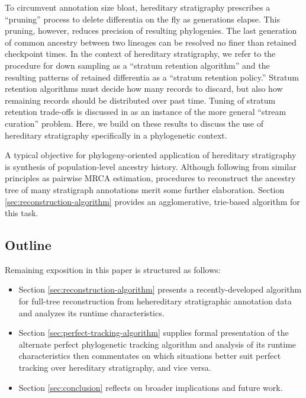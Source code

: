 To circumvent annotation size bloat, hereditary stratigraphy prescribes a ``pruning'' process to delete differentia on the fly as generations elapse.
This pruning, however, reduces precision of resulting phylogenies.
The last generation of common ancestry between two lineages can be resolved no finer than retained checkpoint times.
In the context of hereditary stratigraphy, we refer to the procedure for down sampling as a ``stratum retention algorithm'' and the resulting patterns of retained differentia as a ``stratum retention policy.''
Stratum retention algorithms must decide how many records to discard, but also how remaining records should be distributed over past time.
Tuning of stratum retention trade-offs is discussed in \citet{OTHERPREPRINT} as an instance of the more general ``stream curation'' problem. %
Here, we build on these results to discuss the use of hereditary stratigraphy specifically in a phylogenetic context.

A typical objective for phylogeny-oriented application of hereditary stratigraphy is synthesis of population-level ancestry history.
Although following from similar principles as pairwise MRCA estimation, procedures to reconstruct the ancestry tree of many stratigraph annotations merit some further elaboration.
Section \ref{sec:reconstruction-algorithm} provides an agglomerative, trie-based algorithm for this task.

\subsection{Outline}

Remaining exposition in this paper is structured as follows:
\begin{itemize}
\item Section \ref{sec:reconstruction-algorithm} presents a recently-developed algorithm for full-tree reconstruction from hehereditary stratigraphic annotation data and analyzes its runtime characteristics.
\item Section \ref{sec:perfect-tracking-algorithm} supplies formal presentation of the alternate perfect phylogenetic tracking algorithm and analysis of its runtime characteristics then commentates on which situations better suit perfect tracking over hereditary stratigraphy, and vice versa.
\item Section \ref{sec:conclusion} reflects on broader implications and future work.
\end{itemize}
